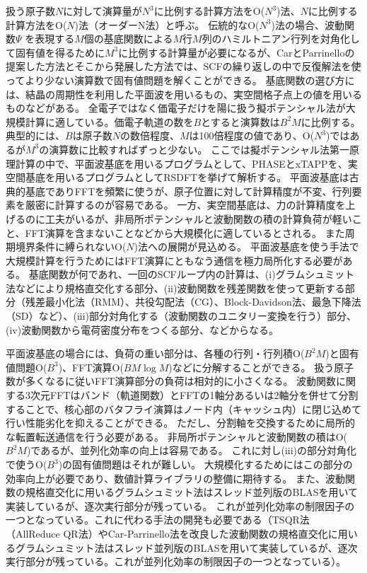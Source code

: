 扱う原子数$N$に対して演算量が$N^3$に比例する計算方法をO($N^3$)法、$N$に比例する計算方法をO($N$)法（オーダーN法）と呼ぶ。
伝統的なO($N^3$)法の場合、波動関数$\Psi$ を表現する$M$個の基底関数による$M$行$M$列のハミルトニアン行列を対角化して固有値を得るために$M^3$に比例する計算量が必要になるが、CarとParrinelloの提案した方法とそこから発展した方法では、SCFの繰り返しの中で反復解法を使ってより少ない演算数で固有値問題を解くことができる。
基底関数の選び方には、結晶の周期性を利用した平面波を用いるもの、実空間格子点上の値を用いるものなどがある。
全電子ではなく価電子だけを陽に扱う擬ポテンシャル法が大規模計算に適している。価電子軌道の数を$B$とすると演算数は$B^2M$に比例する。
典型的には、$B$は原子数$N$の数倍程度、$M$は100倍程度の値であり、O($N^3$)ではあるが$M^3$の演算数に比較すればずっと少ない。
ここでは擬ポテンシャル法第一原理計算の中で、平面波基底を用いるプログラムとして、PHASEとxTAPPを、実空間基底を用いるプログラムとしてRSDFTを挙げて解析する。
平面波基底は古典的基底でありFFTを頻繁に使うが、原子位置に対して計算精度が不変、行列要素を厳密に計算するのが容易である。
一方、実空間基底は、力の計算精度を上げるのに工夫がいるが、非局所ポテンシャルと波動関数の積の計算負荷が軽いこと、FFT演算を含まないことなどから大規模化に適しているとされる。
また周期境界条件に縛られないO($N$)法への展開が見込める。
平面波基底を使う手法で大規模計算を行うためにはFFT演算にともなう通信を極力局所化する必要がある。
基底関数が何であれ、一回のSCFループ内の計算は、(i)グラムシュミット法などにより規格直交化する部分、(ii)波動関数を残差関数を使って更新する部分（残差最小化法（RMM）、共役勾配法（CG）、Block-Davidson法、最急下降法（SD）など）、(iii)部分対角化する（波動関数のユニタリー変換を行う）部分、(iv)波動関数から電荷密度分布をつくる部分、などからなる。

平面波基底の場合には、負荷の重い部分は、各種の行列・行列積O($B^2M$)と固有値問題O($B^3$)、FFT演算O($BM\log M$)などに分解することができる。
扱う原子数が多くなるに従いFFT演算部分の負荷は相対的に小さくなる。
波動関数に関する3次元FFTはバンド（軌道関数）とFFTの1軸分あるいは2軸分を併せて分割することで、核心部のバタフライ演算はノード内（キャッシュ内）に閉じ込めて行い性能劣化を抑えることができる。
ただし、分割軸を交換するために局所的な転置転送通信を行う必要がある。
非局所ポテンシャルと波動関数の積はO($B^2M$)であるが、並列化効率の向上は容易である。
これに対し(iii)の部分対角化で使うO($B^3$)の固有値問題はそれが難しい。
大規模化するためにはこの部分の効率向上が必要であり、数値計算ライブラリの整備に期待する。
また、波動関数の規格直交化に用いるグラムシュミット法はスレッド並列版のBLASを用いて実装しているが、逐次実行部分が残っている。
これが並列化効率の制限因子の一つとなっている。これに代わる手法の開発も必要である（TSQR法（AllReduce QR法）やCar-Parrinello法を改良した波動関数の規格直交化に用いるグラムシュミット法はスレッド並列版のBLASを用いて実装しているが、逐次実行部分が残っている。これが並列化効率の制限因子の一つとなっている）。

